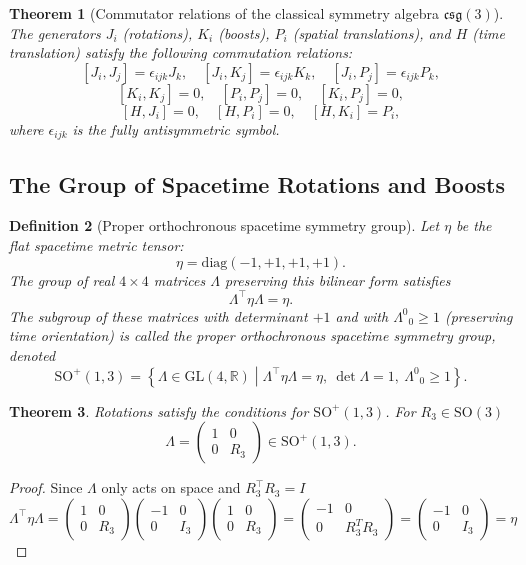 \documentclass{amsart}
\newtheorem{theorem}{Theorem}[section]
\newtheorem{definition}[theorem]{Definition}
\theoremstyle{remark}
\begin{document}
\begin{theorem}[Commutator relations of the classical symmetry algebra $\mathfrak{csg}(3)$]
  The generators \(J_i\) (rotations), \(K_i\) (boosts), \(P_i\) (spatial translations), and \(H\) (time translation) satisfy the following commutation relations:
  \[
  [J_i, J_j] = \epsilon_{ijk} J_k, \quad
  [J_i, K_j] = \epsilon_{ijk} K_k, \quad
  [J_i, P_j] = \epsilon_{ijk} P_k,
  \]
  \[
  [K_i, K_j] = 0, \quad
  [P_i, P_j] = 0, \quad
  [K_i, P_j] = 0,
  \]
  \[
  [H, J_i] = 0, \quad
  [H, P_i] = 0, \quad
  [H, K_i] = P_i,
  \]
  where $\epsilon_{ijk}$ is the fully antisymmetric symbol.
\end{theorem}

\subsection{The Group of Spacetime Rotations and Boosts}
\begin{definition}[Proper orthochronous spacetime symmetry group]
  Let $\eta$ be the flat spacetime metric tensor:
  \[
  \eta = \mathrm{diag}(-1, +1, +1, +1).
  \]
  The group of real $4 \times 4$ matrices $\Lambda$ preserving this bilinear form satisfies
  \[
  \Lambda^\top \eta \Lambda = \eta.
  \]
  The subgroup of these matrices with determinant $+1$ and with $\Lambda^0{}_0 \geq 1$ (preserving time orientation) is called the \emph{proper orthochronous spacetime symmetry group}, denoted
  \[
  \mathrm{SO}^+(1,3) = \left\{ \Lambda \in \mathrm{GL}(4,\mathbb{R}) \middle| \Lambda^\top \eta \Lambda = \eta,\ \det \Lambda = 1,\ \Lambda^0{}_0 \geq 1 \right\}.
  \]
\end{definition}
\begin{theorem}
  Rotations satisfy the conditions for $\mathrm{SO}^+(1,3)$. For $R_3\in\mathrm{SO}(3)$
  \[
  \Lambda = 
  \begin{pmatrix}
    1 & 0 \\
    0 & R_3
  \end{pmatrix} \in \mathrm{SO}^+(1,3).
  \]
\end{theorem}
\begin{proof}
  Since $\Lambda$ only acts on space and $R_3^\top R_3=I$
  \[
  \Lambda^\top\eta \Lambda =
  \begin{pmatrix}
    1 & 0 \\
    0 & R_3
  \end{pmatrix}
  \begin{pmatrix}
    -1 & 0 \\
    0 & I_3
  \end{pmatrix}
  \begin{pmatrix}
    1 & 0 \\
    0 & R_3
  \end{pmatrix} =
  \begin{pmatrix}
    -1 & 0 \\
    0 & R_3^TR_3
  \end{pmatrix} =
  \begin{pmatrix}
    -1 & 0 \\
    0 & I_3
  \end{pmatrix}
  = \eta  
  \]
\end{proof}
\end{document}
